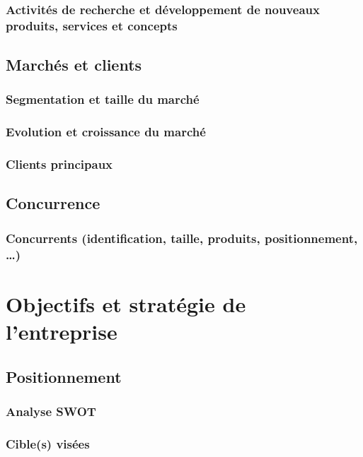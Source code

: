 \documentclass[a4paper]{report}
\begin{document}
\subsection{Activités de recherche et développement de nouveaux produits,
services et concepts}

\section{Marchés et clients}

\subsection{Segmentation et taille du marché}

\subsection{Evolution et croissance du marché}

\subsection{Clients principaux}

\section{Concurrence}

\subsection{Concurrents (identification, taille, produits, positionnement, …)}


\chapter{Objectifs et stratégie de l'entreprise}
\section{Positionnement}

\subsection{Analyse SWOT}

\subsection{Cible(s) visées}
\end{document}
